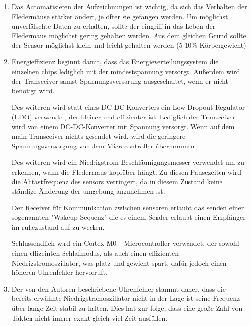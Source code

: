 

\date{Sonntag, 17.05.2020}


    \maketitle
    \thispagestyle{fancy}


    \begin{enumerate}
        \item Das Automatisieren der Aufzeichnungen ist wichtig, da sich das Verhalten der Fledermäuse stärker ändert, je öfter sie gefangen werden. Um möglichst unverfälschte Daten zu erhalten, sollte der eingriff in das Leben der Fledermaus möglichst gering gehalten werden. Aus dem gleichen Grund sollte der Sensor möglichst klein und leicht gehalten werden (5-10\% Körpergewicht)
        
        \item Energieffizienz beginnt damit, dass das Energieverteilungssystem die einzelnen chips lediglich mit der mindestspannung versorgt. Außerdem wird der Transceiver samst Spannungsversorung ausgeschaltet, wenn er nicht benötigt wird. %
        
        Des weiteren wird statt eines DC-DC-Konverters ein Low-Dropout-Regulator (LDO) verwendet, der kleiner und effizienter ist. Lediglich der Transceiver wird von einem DC-DC-Konverter mit Spannung versorgt. Wenn auf dem main Transceiver nichts gesendet wird, wird die geringere Spannungsversorgung von dem Microcontroller übernommen. 
        
        Des weiteren wird ein Niedrigstrom-Beschläunigungs\-messer verwendet um zu erkennen, wann die Fledermaus kopfüber hängt. Zu diesen Pausezeiten wird die Abtastfrequenz des sensors verringert, da in diesem Zustand keine ständige Änderung der umgebung anzunehmen ist. %

        Der Receiver für Kommunikation zwischen sensoren erlaubt das senden einer sogenannten "Wakeup-Sequenz" die es einem Sender erlaubt einen Empfänger im ruhezustand auf zu wecken. %

        Schlussendlich wird ein Cortex M0+ Microcontroller verwendet, der sowohl einen effizeinten Schlafmodus, als auch einen effizienten Niedrigstromoszillator, was platz und gewicht spart, dafür jedoch einen höheren Uhrenfehler hervorruft.
        
        \item Der von den Autoren beschriebene Uhrenfehler stammt daher, dass die bereits erwähnte Niedrigstromoszillator nicht in der Lage ist seine Frequenz über lange Zeit stabil zu halten. Dies hat zur folge, dass eine große Zahl von Takten nicht immer exakt gleich viel Zeit ausfüllen. 
        

\end{enumerate}

